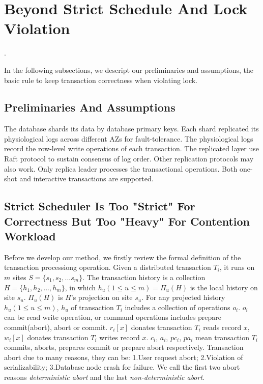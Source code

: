 \documentclass[conference]{IEEEtran}
\begin{document}
\section{Beyond Strict Schedule And Lock Violation}.
\label{sec:non_strict}

In the following subsections, we descript our preliminaries and assumptions, the basic rule to keep transaction correctness when violating lock.

\subsection{Preliminaries And Assumptions}

The database shards its data by database primary keys.
Each shard replicated its physiological logs across different AZs for fault-tolerance.
The physiological logs record the row-level write operations of each transaction.
The replicated layer use Raft protocol to sustain consensus of log order. Other replication protocols may also work.
Only replica leader processes the transactional operations.
Both one-shot and interactive transactions are supported.

\subsection{Strict Scheduler Is Too "Strict" For Correctness But Too "Heavy" For Contention Workload}

Before we develop our method, we firstly review the formal definition of the transaction processiong operation.
Given a distributed transaction ${T_i}$,  it runs on ${m}$ sites  ${S = \{s_1, s_2, ... s_m\}}$.
The transaction history is a collection ${H = \{h_1, h_2, ..., h_m\}}$,
in which ${h_u (1 \le u \le m) = \Pi_u(H)}$ is the local history on site ${s_u}$.
${\Pi_u(H)}$ is ${H}$'s projection on site ${s_u}$.
For any projected history ${h_u(1 \le u \le m)}$, ${h_{u} }$ of transaction ${T_i}$ includes a collection of operations $o_i$.
$o_i$ can be read write operation, or command operations includes prepare commit(abort), abort or commit.
${r_i[x]}$ donates transaction ${T_i}$ reads record ${x}$,  ${w_i[x]}$ donates transaction ${T_i}$ writes record ${x}$.
${c_i}$, ${a_i}$, ${pc_i}$, ${pa_i}$ mean transaction ${T_i}$ commits, aborts, prepares commit or prepare abort respectively.
Transaction abort due to many reasons, they can be:
1.User request abort;
2.Violation of serializability;
3.Database node crash for failure.
We call the first two abort reasons \emph{deterministic abort} and the last \emph{non-deterministic abort}.
\end{document}
